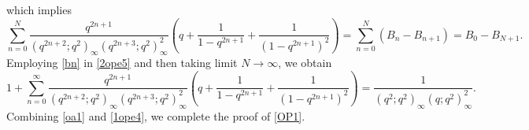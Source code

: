 \documentclass[12pt]{article}
\numberwithin{equation}{section}
\theoremstyle{definition}
\theoremstyle{remark}
\numberwithin{equation}{section}
\begin{document}
which  implies
\begin{equation}\label{2ope5}
\sum_{n=0}^{N}
\dfrac{q^{2n+1}}{(q^{2n+2};q^2)_\infty(q^{2n+3};q^2)_\infty^2}
\left(
q+\dfrac{1}{1-q^{2n+1}}
+\dfrac{1}{(1-q^{2n+1})^2}
\right)
=
\sum_{n=0}^{N}(B_n-B_{n+1})
=
B_0-B_{N+1}.
\end{equation}
Employing \eqref{bn} in \eqref{2ope5}  and then taking limit $N\rightarrow\infty$, we obtain
\begin{equation}\label{oa1}
1+\sum_{n=0}^{\infty}
\dfrac{q^{2n+1}}{(q^{2n+2};q^2)_\infty(q^{2n+3};q^2)_\infty^2}
\left(
q+\dfrac{1}{1-q^{2n+1}}
+\dfrac{1}{(1-q^{2n+1})^2}
\right)
=
\dfrac{1}{(q^2;q^2)_\infty(q;q^2)_\infty^2}.
\end{equation}
Combining \eqref{oa1} and \eqref{1ope4}, we complete the proof of  \eqref{OP1}.\\
\end{document}
